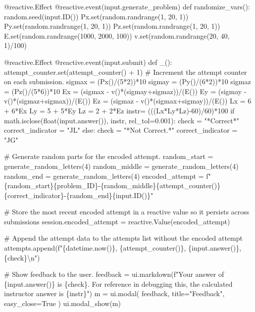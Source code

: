 \documentclass[
  letterpaper,
  DIV=11,
  numbers=noendperiod]{scrreprt}
\newenvironment{Shaded}{\begin{snugshade}}{\end{snugshade}}
\newcommand{\NormalTok}[1]{\textcolor[rgb]{0.00,0.23,0.31}{#1}}
\begin{document}
\begin{Shaded}
\begin{Highlighting}[]
\NormalTok{    @reactive.Effect}
\NormalTok{    @reactive.event(input.generate\_problem)}
\NormalTok{    def randomize\_vars():}
\NormalTok{        random.seed(input.ID())}
\NormalTok{        Px.set(random.randrange(1, 20, 1))}
\NormalTok{        Py.set(random.randrange(1, 20, 1))}
\NormalTok{        Pz.set(random.randrange(1, 20, 1))}
\NormalTok{        E.set(random.randrange(1000, 2000, 100))}
\NormalTok{        v.set(random.randrange(20, 40, 1)/100)}
        
\NormalTok{    @reactive.Effect}
\NormalTok{    @reactive.event(input.submit)}
\NormalTok{    def \_():}
\NormalTok{        attempt\_counter.set(attempt\_counter() + 1)  \# Increment the attempt counter on each submission.}
\NormalTok{        sigmax = (Px()/(5*2))*10}
\NormalTok{        sigmay = (Py()/(6*2))*10}
\NormalTok{        sigmaz = (Pz()/(5*6))*10}
\NormalTok{        Ex = (sigmax {-} v()*(sigmay+sigmaz))/(E())}
\NormalTok{        Ey = (sigmay {-} v()*(sigmaz+sigmax))/(E())}
\NormalTok{        Ez = (sigmaz {-} v()*(sigmax+sigmay))/(E())}
\NormalTok{        Lx = 6 + 6*Ex}
\NormalTok{        Ly = 5 + 5*Ey}
\NormalTok{        Lz = 2 + 2*Ez}
\NormalTok{        instr= (((Lx*Ly*Lz){-}60)/60)*100}
\NormalTok{        if math.isclose(float(input.answer()), instr, rel\_tol=0.001):}
\NormalTok{            check = "*Correct*"}
\NormalTok{            correct\_indicator = "JL"}
\NormalTok{        else:}
\NormalTok{            check = "*Not Correct.*"}
\NormalTok{            correct\_indicator = "JG"}

\NormalTok{        \# Generate random parts for the encoded attempt.}
\NormalTok{        random\_start = generate\_random\_letters(4)}
\NormalTok{        random\_middle = generate\_random\_letters(4)}
\NormalTok{        random\_end = generate\_random\_letters(4)}
\NormalTok{        encoded\_attempt = f"\{random\_start\}\{problem\_ID\}{-}\{random\_middle\}\{attempt\_counter()\}\{correct\_indicator\}{-}\{random\_end\}\{input.ID()\}"}

\NormalTok{        \# Store the most recent encoded attempt in a reactive value so it persists across submissions}
\NormalTok{        session.encoded\_attempt = reactive.Value(encoded\_attempt)}

\NormalTok{        \# Append the attempt data to the attempts list without the encoded attempt}
\NormalTok{        attempts.append(f"\{datetime.now()\}, \{attempt\_counter()\}, \{input.answer()\}, \{check\}\textbackslash{}n")}

\NormalTok{        \# Show feedback to the user.}
\NormalTok{        feedback = ui.markdown(f"Your answer of \{input.answer()\} is \{check\}. For reference in debugging this, the calculated instructor answer is \{instr\}")}
\NormalTok{        m = ui.modal(}
\NormalTok{            feedback,}
\NormalTok{            title="Feedback",}
\NormalTok{            easy\_close=True}
\NormalTok{        )}
\NormalTok{        ui.modal\_show(m)}


\end{Highlighting}
\end{Shaded}
\end{document}
